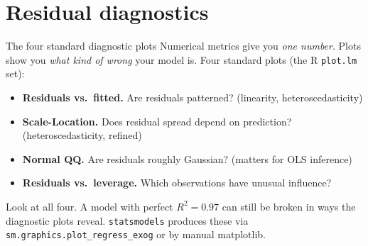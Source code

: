 \documentclass[aspectratio=169]{beamer}
\begin{document}
\section{Residual diagnostics}

\begin{frame}{The four standard diagnostic plots}
  Numerical metrics give you \emph{one number}. Plots show you \emph{what kind of wrong} your model is. Four standard plots (the R \texttt{plot.lm} set):
  \vfill
  \begin{itemize}
    \item \textbf{Residuals vs.\ fitted.} Are residuals patterned? (linearity, heteroscedasticity)
    \item \textbf{Scale-Location.} Does residual spread depend on prediction? (heteroscedasticity, refined)
    \item \textbf{Normal QQ.} Are residuals roughly Gaussian? (matters for OLS inference)
    \item \textbf{Residuals vs.\ leverage.} Which observations have unusual influence?
  \end{itemize}
  \vfill
  Look at all four. A model with perfect $R^2 = 0.97$ can still be broken in ways the diagnostic plots reveal.
  \vfill
  \texttt{statsmodels} produces these via \texttt{sm.graphics.plot\_regress\_exog} or by manual matplotlib.
\end{frame}
\end{document}
